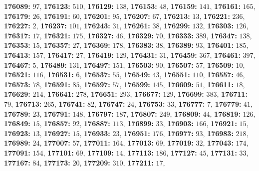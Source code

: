 \textsf{\bfseries 176089:} $97$, \textsf{\bfseries 176123:} $510$, \textsf{\bfseries 176129:} $138$, \textsf{\bfseries 176153:} $48$, \textsf{\bfseries 176159:} $141$, \textsf{\bfseries 176161:} $165$, \textsf{\bfseries 176179:} $26$, \textsf{\bfseries 176191:} $60$, \textsf{\bfseries 176201:} $95$, \textsf{\bfseries 176207:} $67$, \textsf{\bfseries 176213:} $13$, \textsf{\bfseries 176221:} $236$, \textsf{\bfseries 176227:} $2$, \textsf{\bfseries 176237:} $101$, \textsf{\bfseries 176243:} $31$, \textsf{\bfseries 176261:} $38$, \textsf{\bfseries 176299:} $132$, \textsf{\bfseries 176303:} $126$, \textsf{\bfseries 176317:} $17$, \textsf{\bfseries 176321:} $175$, \textsf{\bfseries 176327:} $46$, \textsf{\bfseries 176329:} $70$, \textsf{\bfseries 176333:} $389$, \textsf{\bfseries 176347:} $138$, \textsf{\bfseries 176353:} $15$, \textsf{\bfseries 176357:} $27$, \textsf{\bfseries 176369:} $178$, \textsf{\bfseries 176383:} $38$, \textsf{\bfseries 176389:} $93$, \textsf{\bfseries 176401:} $185$, \textsf{\bfseries 176413:} $157$, \textsf{\bfseries 176417:} $27$, \textsf{\bfseries 176419:} $129$, \textsf{\bfseries 176431:} $31$, \textsf{\bfseries 176459:} $367$, \textsf{\bfseries 176461:} $397$, \textsf{\bfseries 176467:} $5$, \textsf{\bfseries 176489:} $131$, \textsf{\bfseries 176497:} $151$, \textsf{\bfseries 176503:} $90$, \textsf{\bfseries 176507:} $57$, \textsf{\bfseries 176509:} $10$, \textsf{\bfseries 176521:} $116$, \textsf{\bfseries 176531:} $6$, \textsf{\bfseries 176537:} $55$, \textsf{\bfseries 176549:} $43$, \textsf{\bfseries 176551:} $110$, \textsf{\bfseries 176557:} $46$, \textsf{\bfseries 176573:} $78$, \textsf{\bfseries 176591:} $85$, \textsf{\bfseries 176597:} $57$, \textsf{\bfseries 176599:} $145$, \textsf{\bfseries 176609:} $51$, \textsf{\bfseries 176611:} $18$, \textsf{\bfseries 176629:} $214$, \textsf{\bfseries 176641:} $278$, \textsf{\bfseries 176651:} $293$, \textsf{\bfseries 176677:} $129$, \textsf{\bfseries 176699:} $383$, \textsf{\bfseries 176711:} $79$, \textsf{\bfseries 176713:} $265$, \textsf{\bfseries 176741:} $82$, \textsf{\bfseries 176747:} $24$, \textsf{\bfseries 176753:} $33$, \textsf{\bfseries 176777:} $7$, \textsf{\bfseries 176779:} $41$, \textsf{\bfseries 176789:} $23$, \textsf{\bfseries 176791:} $148$, \textsf{\bfseries 176797:} $187$, \textsf{\bfseries 176807:} $249$, \textsf{\bfseries 176809:} $44$, \textsf{\bfseries 176819:} $126$, \textsf{\bfseries 176849:} $15$, \textsf{\bfseries 176857:} $92$, \textsf{\bfseries 176887:} $113$, \textsf{\bfseries 176899:} $33$, \textsf{\bfseries 176903:} $166$, \textsf{\bfseries 176921:} $15$, \textsf{\bfseries 176923:} $13$, \textsf{\bfseries 176927:} $15$, \textsf{\bfseries 176933:} $23$, \textsf{\bfseries 176951:} $176$, \textsf{\bfseries 176977:} $93$, \textsf{\bfseries 176983:} $218$, \textsf{\bfseries 176989:} $24$, \textsf{\bfseries 177007:} $57$, \textsf{\bfseries 177011:} $164$, \textsf{\bfseries 177013:} $69$, \textsf{\bfseries 177019:} $32$, \textsf{\bfseries 177043:} $174$, \textsf{\bfseries 177091:} $154$, \textsf{\bfseries 177101:} $69$, \textsf{\bfseries 177109:} $14$, \textsf{\bfseries 177113:} $186$, \textsf{\bfseries 177127:} $45$, \textsf{\bfseries 177131:} $33$, \textsf{\bfseries 177167:} $84$, \textsf{\bfseries 177173:} $20$, \textsf{\bfseries 177209:} $310$, \textsf{\bfseries 177211:} $17$, 
